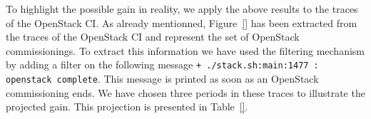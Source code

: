To highlight the possible gain in reality, we apply the above results
to the traces of the OpenStack CI. As already mentionned,
Figure~\ref{} has been extracted from the traces of the OpenStack CI
and represent the set of OpenStack commissionings. To extract this
information we have used the filtering mechanism by adding a filter on
the following message \texttt{+ ./stack.sh:main:1477 : openstack
  complete}. This message is printed as soon as an OpenStack
commissioning ends. We have chosen three periods in these traces to
illustrate the projected gain. This projection is presented in
Table~\ref{}.
%




